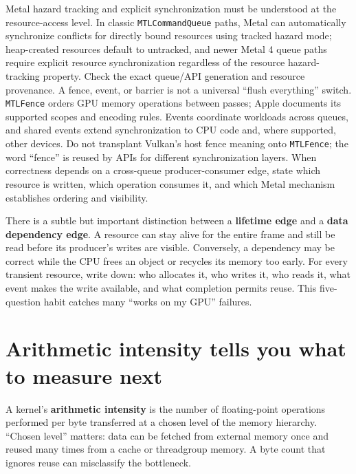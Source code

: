 Metal hazard tracking and explicit synchronization must be understood at the resource-access level. In classic \texttt{MTLCommandQueue} paths, Metal can automatically synchronize conflicts for directly bound resources using tracked hazard mode; heap-created resources default to untracked, and newer Metal 4 queue paths require explicit resource synchronization regardless of the resource hazard-tracking property. Check the exact queue/API generation and resource provenance. A fence, event, or barrier is not a universal ``flush everything'' switch. \texttt{MTLFence} orders GPU memory operations between passes; Apple documents its supported scopes and encoding rules. Events coordinate workloads across queues, and shared events extend synchronization to CPU code and, where supported, other devices. Do not transplant Vulkan's host fence meaning onto \texttt{MTLFence}; the word ``fence'' is reused by APIs for different synchronization layers. When correctness depends on a cross-queue producer-consumer edge, state which resource is written, which operation consumes it, and which Metal mechanism establishes ordering and visibility.

There is a subtle but important distinction between a \textbf{lifetime edge} and a \textbf{data dependency edge}. A resource can stay alive for the entire frame and still be read before its producer's writes are visible. Conversely, a dependency may be correct while the CPU frees an object or recycles its memory too early. For every transient resource, write down: who allocates it, who writes it, who reads it, what event makes the write available, and what completion permits reuse. This five-question habit catches many ``works on my GPU'' failures.

\section{Arithmetic intensity tells you what to measure next}\label{01-foundations-i-ch011-arithmetic-intensity-tells-you-what-to-measure-next}

\hypertarget{01-foundations-i-ch011-arithmetic-intensity-tells-you-what-to-measure-next}{}

A kernel's \textbf{arithmetic intensity} is the number of floating-point operations performed per byte transferred at a chosen level of the memory hierarchy. ``Chosen level'' matters: data can be fetched from external memory once and reused many times from a cache or threadgroup memory. A byte count that ignores reuse can misclassify the bottleneck.

